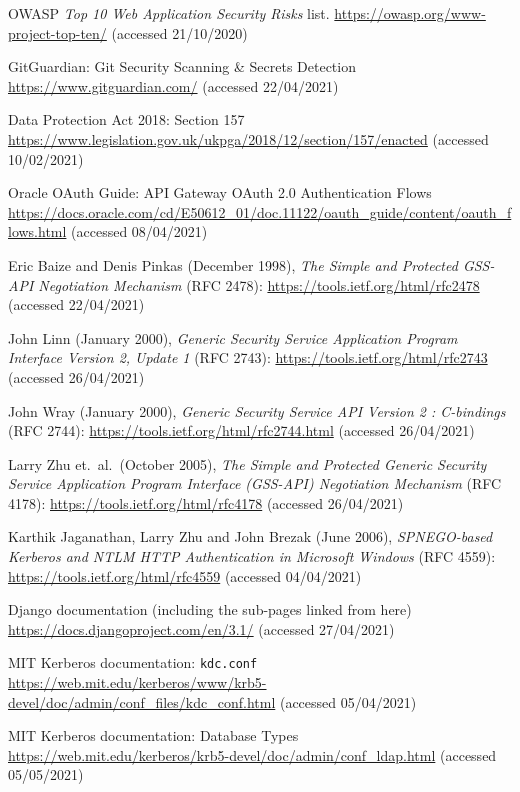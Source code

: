 \documentclass{report}
\begin{document}
\begin{thebibliography}{99}
 OWASP \textit{Top 10 Web Application Security Risks} list. \url{https://owasp.org/www-project-top-ten/} (accessed 21/10/2020)

 GitGuardian: Git Security Scanning \& Secrets Detection \url{https://www.gitguardian.com/} (accessed 22/04/2021)

 Data Protection Act 2018: Section 157 \url{https://www.legislation.gov.uk/ukpga/2018/12/section/157/enacted} (accessed 10/02/2021)

 Oracle OAuth Guide: API Gateway OAuth 2.0 Authentication Flows \url{https://docs.oracle.com/cd/E50612_01/doc.11122/oauth_guide/content/oauth_flows.html} (accessed 08/04/2021)

 Eric Baize and Denis Pinkas (December 1998), \textit{The Simple and Protected GSS-API Negotiation Mechanism} (RFC 2478): \url{https://tools.ietf.org/html/rfc2478} (accessed 22/04/2021)

 John Linn (January 2000), \textit{Generic Security Service Application Program Interface Version 2, Update 1} (RFC 2743): \url{https://tools.ietf.org/html/rfc2743} (accessed 26/04/2021)

 John Wray (January 2000), \textit{Generic Security Service API Version 2 : C-bindings} (RFC 2744): \url{https://tools.ietf.org/html/rfc2744.html} (accessed 26/04/2021)

 Larry Zhu et.\ al.\ (October 2005), \textit{The Simple and Protected Generic Security Service Application Program Interface (GSS-API) Negotiation Mechanism} (RFC 4178): \url{https://tools.ietf.org/html/rfc4178} (accessed 26/04/2021)

 Karthik Jaganathan, Larry Zhu and John Brezak (June 2006), \textit{SPNEGO-based Kerberos and NTLM HTTP Authentication in Microsoft Windows} (RFC 4559): \url{https://tools.ietf.org/html/rfc4559} (accessed 04/04/2021)

 Django documentation (including the sub-pages linked from here) \url{https://docs.djangoproject.com/en/3.1/} (accessed 27/04/2021)

 MIT Kerberos documentation: \texttt{kdc.conf} \url{https://web.mit.edu/kerberos/www/krb5-devel/doc/admin/conf_files/kdc_conf.html} (accessed 05/04/2021)

 MIT Kerberos documentation: Database Types \url{https://web.mit.edu/kerberos/krb5-devel/doc/admin/conf_ldap.html} (accessed 05/05/2021)


\end{thebibliography}
\end{document}
